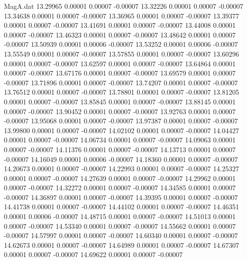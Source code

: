 \begin{filecontents}{MagA.dat}
  13.29965    0.00001    0.00007   -0.00007
  13.32226    0.00001    0.00007   -0.00007
  13.34638    0.00001    0.00007   -0.00007
  13.36965    0.00001    0.00007   -0.00007
  13.39377    0.00001    0.00007   -0.00007
  13.41691    0.00001    0.00007   -0.00007
  13.44008    0.00001    0.00007   -0.00007
  13.46323    0.00001    0.00007   -0.00007
  13.48642    0.00001    0.00007   -0.00007
  13.50939    0.00001    0.00006   -0.00007
  13.53252    0.00001    0.00006   -0.00007
  13.55549    0.00001    0.00007   -0.00007
  13.57855    0.00001    0.00007   -0.00007
  13.60296    0.00001    0.00007   -0.00007
  13.62597    0.00001    0.00007   -0.00007
  13.64864    0.00001    0.00007   -0.00007
  13.67176    0.00001    0.00007   -0.00007
  13.69579    0.00001    0.00007   -0.00007
  13.71896    0.00001    0.00007   -0.00007
  13.74207    0.00001    0.00007   -0.00007
  13.76512    0.00001    0.00007   -0.00007
  13.78801    0.00001    0.00007   -0.00007
  13.81205    0.00001    0.00007   -0.00007
  13.85845    0.00001    0.00007   -0.00007
  13.88145    0.00001    0.00007   -0.00007
  13.90452    0.00001    0.00007   -0.00007
  13.92763    0.00001    0.00007   -0.00007
  13.95068    0.00001    0.00007   -0.00007
  13.97387    0.00001    0.00007   -0.00007
  13.99800    0.00001    0.00007   -0.00007
  14.02102    0.00001    0.00007   -0.00007
  14.04427    0.00001    0.00007   -0.00007
  14.06734    0.00001    0.00007   -0.00007
  14.09063    0.00001    0.00007   -0.00007
  14.11376    0.00001    0.00007   -0.00007
  14.13713    0.00001    0.00007   -0.00007
  14.16049    0.00001    0.00006   -0.00007
  14.18360    0.00001    0.00007   -0.00007
  14.20673    0.00001    0.00007   -0.00007
  14.22993    0.00001    0.00007   -0.00007
  14.25327    0.00001    0.00007   -0.00007
  14.27639    0.00001    0.00007   -0.00007
  14.29962    0.00001    0.00007   -0.00007
  14.32272    0.00001    0.00007   -0.00007
  14.34585    0.00001    0.00007   -0.00007
  14.36897    0.00001    0.00007   -0.00007
  14.39395    0.00001    0.00007   -0.00007
  14.41738    0.00001    0.00007   -0.00007
  14.44102    0.00001    0.00007   -0.00007
  14.46351    0.00001    0.00006   -0.00007
  14.48715    0.00001    0.00007   -0.00007
  14.51013    0.00001    0.00007   -0.00007
  14.53340    0.00001    0.00007   -0.00007
  14.55662    0.00001    0.00007   -0.00007
  14.57997    0.00001    0.00007   -0.00007
  14.60340    0.00001    0.00007   -0.00007
  14.62673    0.00001    0.00007   -0.00007
  14.64989    0.00001    0.00007   -0.00007
  14.67307    0.00001    0.00007   -0.00007
  14.69622    0.00001    0.00007   -0.00007

\end{filecontents}
